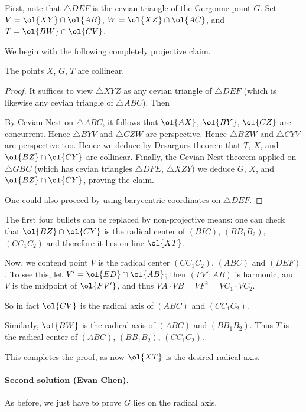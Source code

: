 First, note that $\triangle DEF$ is the cevian triangle of the Gergonne point $G$.
Set $V = \ol{XY} \cap \ol{AB}$, $W = \ol{XZ} \cap \ol{AC}$, and $T = \ol{BW} \cap \ol{CV}$.

We begin with the following completely projective claim.
\begin{claim*}
  The points $X$, $G$, $T$ are collinear.
\end{claim*}
\begin{proof}
  It suffices to view $\triangle XYZ$ as any cevian triangle of $\triangle DEF$
  (which is likewise any cevian triangle of $\triangle ABC$).
  Then
  \begin{itemize}
    \ii By Cevian Nest on $\triangle ABC$,
    it follows that $\ol{AX}$, $\ol{BY}$, $\ol{CZ}$ are concurrent.
    \ii Hence $\triangle BYV$ and $\triangle CZW$ are perspective.
    \ii Hence $\triangle BZW$ and $\triangle CYV$ are perspective too.
    \ii Hence we deduce by Desargues theorem that $T$, $X$,
    and $\ol{BZ} \cap \ol{CY}$ are collinear.
    \ii Finally, the Cevian Nest theorem applied on $\triangle GBC$
    (which has cevian triangles $\triangle DFE$, $\triangle XZY$)
    we deduce $G$, $X$, and $\ol{BZ} \cap \ol{CY}$, proving the claim.
  \end{itemize}
  One could also proceed by using barycentric coordinates on $\triangle DEF$.
\end{proof}
\begin{remark*}
  The first four bullets can be replaced by non-projective means:
  one can check that $\ol{BZ} \cap \ol{CY}$ is the radical center
  of $(BIC)$, $(BB_1B_2)$, $(CC_1C_2)$ and therefore it lies on line $\ol{XT}$.
\end{remark*}

Now, we contend point $V$ is the radical center $(CC_1C_2)$, $(ABC)$ and $(DEF)$.
To see this, let $V' = \ol{ED} \cap \ol{AB}$;
then $(FV';AB)$ is harmonic, and $V$ is the midpoint of $\ol{FV'}$,
and thus $VA \cdot VB = VF^2 = VC_1 \cdot VC_2$.

So in fact $\ol{CV}$ is the radical axis of $(ABC)$ and $(CC_1C_2)$.

Similarly, $\ol{BW}$ is the radical axis of $(ABC)$ and $(BB_1B_2)$.
Thus $T$ is the radical center of $(ABC)$, $(BB_1B_2)$, $(CC_1C_2)$.

This completes the proof, as now $\ol{XT}$ is the desired radical axis.

\paragraph{Second solution (Evan Chen).}
As before, we just have to prove $G$ lies on the radical axis.

